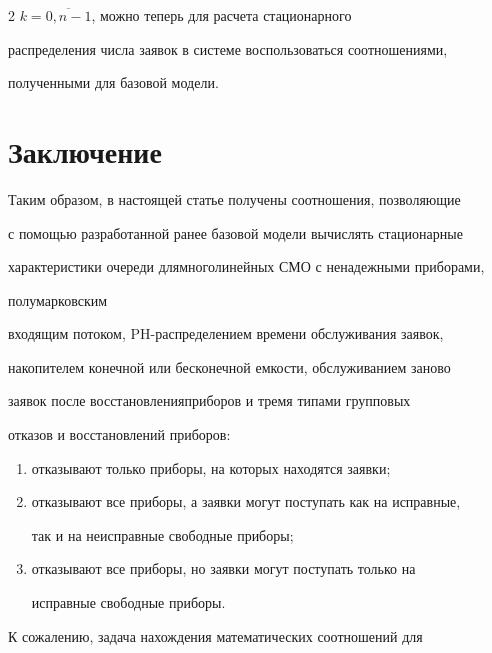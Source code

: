 \begin{multicols}{2}
$k=\overline{0,n-1}$, можно теперь для расчета стационарного


распределения числа заявок в системе воспользоваться соотношениями,


полученными для базовой модели.





\section{Заключение}





Таким образом, в настоящей статье получены соотношения, позволяющие


с помощью разра\-ботанной ранее базовой модели вы\-чис\-лять стационарные


характеристики очереди для\linebreak многолинейных СМО с ненадежными приборами,


полумарковским


входящим потоком, PH-рас\-пре\-де\-ле\-ни\-ем времени об\-слу\-жи\-ва\-ния заявок,


накопителем конечной или бесконечной емкости, обслу\-жи\-ва\-ни\-ем заново


заявок после восстановления\linebreak приборов и тремя типами групповых


отказов и восстановлений приборов:


\begin{enumerate}[(1)]


\item отказывают только приборы, на которых находятся заявки;


\item отказывают все приборы, а заявки могут поступать как на исправные,


так и на неисправные свободные приборы;


\item


отказывают все приборы, но заявки могут поступать только на


исправные свободные приборы.


\end{enumerate}





К сожалению, задача нахождения математических соотношений для



\end{multicols}
